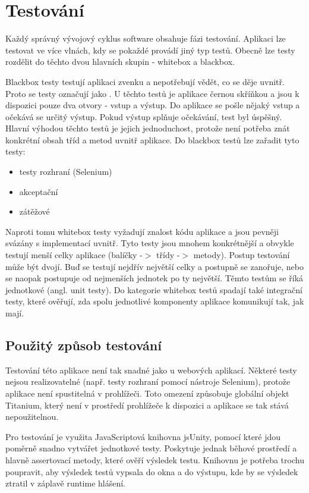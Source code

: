 \chapter{Testování}

Každý správný vývojový cyklus software obsahuje fázi testování\cite{zivotnicyklus}. Aplikaci lze testovat ve více vlnách, kdy se pokaždé provádí jiný typ testů. Obecně lze testy rozdělit do těchto dvou hlavních skupin - whitebox a blackbox.

Blackbox testy testují aplikaci zvenku a nepotřebují vědět, co se děje uvnitř. Proto se testy označují jako . U těchto testů je aplikace černou skříňkou a jsou k dispozici pouze dva otvory - vstup a výstup. Do aplikace se pošle nějaký vstup a očekává se určitý výstup. Pokud výstup splňuje očekávání, test byl úspěšný. Hlavní výhodou těchto testů je jejich jednoduchost, protože není potřeba znát konkrétní obsah tříd a metod uvnitř aplikace. Do blackbox testů lze zařadit tyto testy:

\begin{itemize}
\item testy rozhraní (Selenium)
\item akceptační
\item zátěžové
\end{itemize}

Naproti tomu whitebox testy vyžadují znalost kódu aplikace a jsou pevněji svázány s implementací uvnitř. Tyto testy jsou mnohem konkrétnější a obvykle testují menší celky aplikace (balíčky -$>$ třídy -$>$ metody). Postup testování může být dvojí. Buď se testují nejdřív největší celky a postupně se zanořuje, nebo se naopak postupuje od nejmenších jednotek po ty největší. Těmto testům se říká jednotkové (angl. unit testy). Do kategorie whitebox testů spadají také integrační testy, které ověřují, zda spolu jednotlivé komponenty aplikace komunikují tak, jak mají.

\section{Použitý způsob testování}

Testování této aplikace není tak snadné jako u webových aplikací. Některé testy nejsou realizovatelné (např. testy rozhraní pomocí nástroje Selenium), protože aplikace není spustitelná v prohlížeči. Toto omezení způsobuje globální objekt Titanium, který není v prostředí prohlížeče k dispozici a aplikace se tak stává nepoužitelnou.

Pro testování je využita JavaScriptová knihovna jsUnity\cite{jsunity}, pomocí které jdou poměrně snadno vytvářet jednotkové testy. Poskytuje jednak běhové prostředí a hlavně assertovací metody, které ověří výsledek testu. Knihovnu je potřeba trochu poupravit, aby výsledek testů vypsala do okna a do výstupu, kde by se výsledek ztratil v záplavě runtime hlášení.

